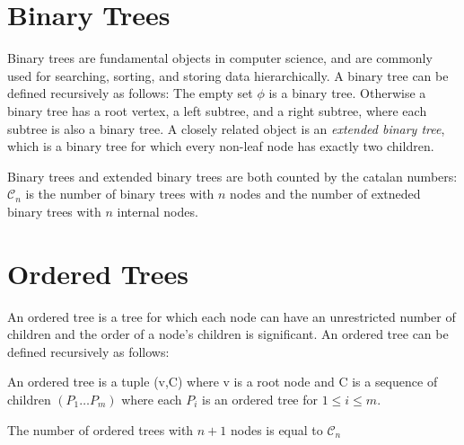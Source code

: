 

\section{Binary Trees}

Binary trees are fundamental objects in computer science, and are commonly used for searching, sorting, and storing data hierarchically. A binary tree can be defined recursively as follows: The empty set $\phi$ is a binary tree. Otherwise a binary tree has a root vertex, a left subtree, and a right subtree, where each subtree is also a binary tree. A closely related object is an \emph{extended binary tree}, which is a binary tree for which every non-leaf node has exactly two children.  

Binary trees and extended binary trees are both counted by the catalan numbers: $\mathcal{C}_n$ is the number of binary trees with $n$ nodes and the number of extneded binary trees with $n$ internal nodes.  


\section{Ordered Trees}

An ordered tree is a tree for which each node can have an unrestricted number of children and the order of a node's children is significant.  An ordered tree can be defined recursively as follows:


An ordered tree is a tuple (v,C) where v is a root node and C is a sequence of children $(P_1\dots P_m)$ where each $P_i$ is an ordered tree for $1 \le i \le m$.

The number of ordered trees with $n+1$ nodes is equal to $\mathcal{C}_n$

